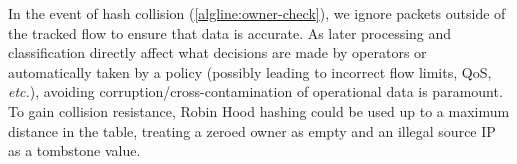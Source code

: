 In the event of hash collision (\cref{algline:owner-check}), we ignore packets outside of the tracked flow to ensure that data is accurate.
As later processing and classification directly affect what decisions are made by operators or automatically taken by a policy (possibly leading to incorrect flow limits, QoS, \emph{etc.}), avoiding corruption/cross-contamination of operational data is paramount.
To gain collision resistance, Robin Hood hashing could be used up to a maximum distance in the table, treating a zeroed owner as empty and an illegal source IP as a tombstone value.

\begin{table}
    \centering
    \caption{Register map (Datatype, Amount) for an $h$-bit hash.}
    \label{tab:registers}
\end{table}


